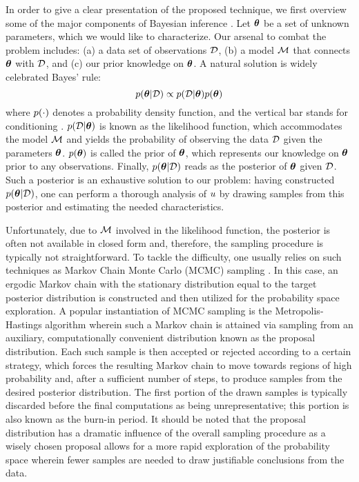 In order to give a clear presentation of the proposed technique, we first overview some of the major components of Bayesian inference \cite{gelman2004}.
Let ${\boldsymbol\theta}$ be a set of unknown parameters, which we would like to characterize. Our arsenal to combat the problem includes: (a) a data set of observations $\mathcal{D}$, (b) a model $\model$ that connects ${\boldsymbol\theta}$ with $\mathcal{D}$, and (c) our prior knowledge on ${\boldsymbol\theta}$. A natural solution is widely celebrated Bayes' rule:
\[
  \f{\vparam | \Data} \propto \f{\Data | \vparam} \f{\vparam}
\]
where $\f{\cdot}$ denotes a probability density function, and the vertical bar stands for conditioning \cite{durrett2010}.
$\f{\Data | \vparam}$ is known as the likelihood function, which accommodates the model $\model$ and yields the probability of observing the data $\mathcal{D}$ given the parameters ${\boldsymbol\theta}$.
$\f{\vparam}$ is called the prior of ${\boldsymbol\theta}$, which represents our knowledge on ${\boldsymbol\theta}$ prior to any observations.
Finally, $\f{\vparam | \Data}$ reads as the posterior of ${\boldsymbol\theta}$ given $\mathcal{D}$. Such a posterior is an exhaustive solution to our problem: having constructed $\f{\vparam | \Data}$, one can perform a thorough analysis of $u$ by drawing samples from this posterior and estimating the needed characteristics.

Unfortunately, due to $\model$ involved in the likelihood function, the posterior is often not available in closed form and, therefore, the sampling procedure is typically not straightforward.
To tackle the difficulty, one usually relies on such techniques as Markov Chain Monte Carlo (MCMC) sampling \cite{gelman2004}. In this case, an ergodic Markov chain with the stationary distribution equal to the target posterior distribution is constructed and then utilized for the probability space exploration.
A popular instantiation of MCMC sampling is the Metropolis-Hastings algorithm wherein such a Markov chain is attained via sampling from an auxiliary, computationally convenient distribution known as the proposal distribution.
Each such sample is then accepted or rejected according to a certain strategy, which forces the resulting Markov chain to move towards regions of high probability and, after a sufficient number of steps, to produce samples from the desired posterior distribution.
The first portion of the drawn samples is typically discarded before the final computations as being unrepresentative; this portion is also known as the burn-in period.
It should be noted that the proposal distribution has a dramatic influence of the overall sampling procedure as a wisely chosen proposal allows for a more rapid exploration of the probability space wherein fewer samples are needed to draw justifiable conclusions from the data.
